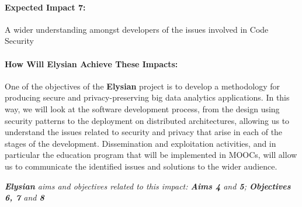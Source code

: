 \documentclass[a4paper,11pt]{article}
\newcommand{\project}[1]{\textbf{#1}\xspace}
\newcommand{\SECURITY}{\project{Elysian}}
\newcommand{\TheProject}{\SECURITY}
\begin{document}

\begin{mdframed}[backgroundcolor=blue!5]
\paragraph{Expected Impact 7:}
A wider understanding amongst developers of the issues involved in Code Security
\end{mdframed}

\begin{mdframed}[backgroundcolor=gray!10]
\paragraph{How Will \TheProject{} Achieve These Impacts:}
One of the objectives of the \TheProject{} project is to develop a methodology for producing secure and privacy-preserving big data analytics applications. In this way, we will look at the software development process, from the design using security patterns to the deployment on distributed architectures, allowing us to understand the issues related to security and privacy that arise in each of the stages of the development. Dissemination and exploitation activities, and in particular the education program that will be implemented in MOOCs, will allow us to communicate the identified issues and solutions to the wider audience.

\emph{\TheProject{} aims and objectives related to this impact: \textbf{Aims 4 } and \textbf{5}; \textbf{Objectives 6, 7} and \textbf{8}}
\end{mdframed}


\end{document}

